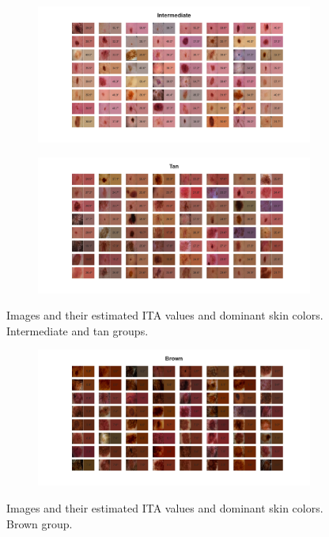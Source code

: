 \begin{figure}[hp]
     \centering
     \begin{subfigure}{0.99\textwidth}
         \centering
         \includegraphics[width=\textwidth]{figures/eda/3 - Intermediate.png}
     \end{subfigure}
     \hfill
     \begin{subfigure}{0.99\textwidth}
         \centering
         \includegraphics[width=\textwidth]{figures/eda/4 - Tan.png}
     \end{subfigure}
     \hfill
	\caption{Images and their estimated ITA values and dominant skin colors. Intermediate and tan groups.}
	\label{fig:skin_colors_2}
\end{figure}

\begin{figure}[hp]
     \centering
     \begin{subfigure}{0.99\textwidth}
         \centering
         \includegraphics[width=\textwidth]{figures/eda/5 - Brown.png}
     \end{subfigure}
     \hfill
	\caption{Images and their estimated ITA values and dominant skin colors. Brown group.}
	\label{fig:skin_colors_3}
\end{figure}